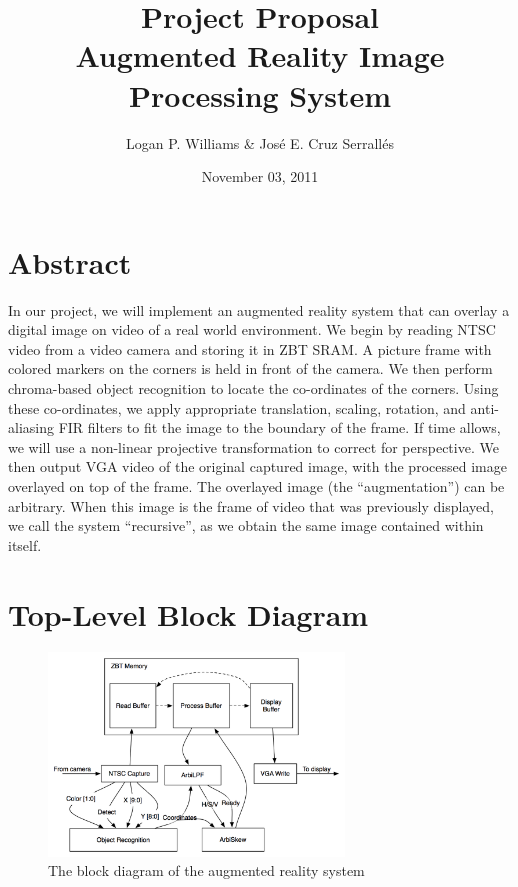\documentclass[10pt]{article}
\begin{document}
\title{Project Proposal\\Augmented Reality Image Processing System}
\author{Logan P. Williams \& Jos\'{e} E. Cruz Serrall\'{e}s}
\date{November 03, 2011}
\maketitle

\section{Abstract}
In our project, we will implement an augmented reality system that can overlay a digital image on video of a real world environment. We begin by reading NTSC video from a video camera and storing it in ZBT SRAM. A picture frame with colored markers on the corners is held in front of the camera. We then perform chroma-based object recognition to locate the co-ordinates of the corners. Using these co-ordinates, we apply appropriate translation, scaling, rotation, and anti-aliasing FIR filters to fit the image to the boundary of the frame. If time allows, we will use a non-linear projective transformation to correct for perspective. We then output VGA video of the original captured image, with the processed image overlayed on top of the frame. The overlayed image (the ``augmentation'') can be arbitrary. When this image is the frame of video that was previously displayed, we call the system ``recursive'', as we obtain the same image contained within itself.
\newpage
\section{Top-Level Block Diagram}
\begin{figure}[h!]
\centering
\includegraphics[width=0.7\textwidth]{block_diagram.png}
\caption{The block diagram of the augmented reality system}
\end{figure}
\end{document}
